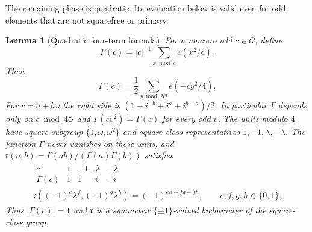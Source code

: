 \documentclass[11pt,a4paper]{article}
\numberwithin{equation}{section}
\numberwithin{figure}{section}
\newtheorem{lemma}[theorem]{Lemma}
\theoremstyle{definition}
\theoremstyle{remark}
\begin{document}
The remaining phase is quadratic.  Its evaluation below is valid even for
odd elements that are not squarefree or primary.

\begin{lemma}[Quadratic four-term formula]\label{lem:quadratic-four-term}
For a nonzero odd $c\in\mathcal O$, define
\[
 \Gamma(c)=|c|^{-1}\sum_{x\bmod c}e(x^2/c).
\]
Then
\begin{equation}\label{eq:quadratic-four-term}
 \Gamma(c)=\frac12\sum_{y\bmod2\mathcal O}e(-cy^2/4).
\end{equation}
For $c=a+b\omega$ the right side is
$(1+i^{-b}+i^a+i^{b-a})/2$.  In particular $\Gamma$ depends only on
$c\bmod4\mathcal O$ and $\Gamma(cv^2)=\Gamma(c)$ for every odd $v$.
The units modulo $4$ have square subgroup $\{1,\omega,\omega^2\}$ and
square-class representatives $1,-1,\lambda,-\lambda$.  The function
$\Gamma$ never vanishes on these units, and
$\mathfrak r(a,b)=\Gamma(ab)/(\Gamma(a)\Gamma(b))$ satisfies
\begin{equation}\label{eq:reciprocity-four-class}
 \begin{gathered}
 \begin{array}{c|rrrr}
  c&1&-1&\lambda&-\lambda\\ \hline
  \Gamma(c)&1&1&i&-i
 \end{array}\\
 \mathfrak r((-1)^e\lambda^f,(-1)^g\lambda^h)
       =(-1)^{eh+fg+fh},\qquad e,f,g,h\in\{0,1\}.
 \end{gathered}
\end{equation}
Thus $|\Gamma(c)|=1$ and $\mathfrak r$ is a symmetric
$\{\pm1\}$-valued bicharacter of the square-class group.
\end{lemma}
\end{document}
